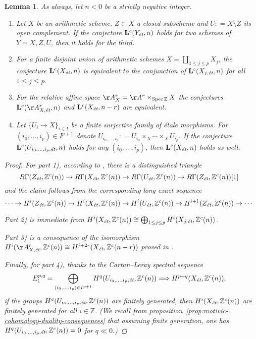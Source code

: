 \documentclass[draft,leqno,12pt]{article}
\theoremstyle{plain}
\newtheorem{lemma}[theorem]{\indent\sc Lemma}
\theoremstyle{definition}
\DeclareMathOperator{\Spec}{Spec}
\newcommand{\ZZ}{\mathbb{Z}}
\newcommand{\dfn}{\mathrel{\mathop:}=}
\newcommand{\et}{\text{\it \'{e}t}}
\begin{document}
\begin{lemma}
  \label{lemma:Lc(Xet)-operations}
  As always, let $n < 0$ be a strictly negative integer.

  \begin{enumerate}
  \item[$1)$] Let $X$ be an arithmetic scheme, $Z \subset X$ a closed subscheme
    and $U \dfn X\setminus Z$ its open complement. If the conjecture
    $\mathbf{L}^c (Y_\et,n)$ holds for two schemes of $Y = X,Z,U$, then it holds
    for the third.

  \item[$2)$] For a finite disjoint union of arithmetic schemes
    $X = \coprod_{1 \le j \le p} X_j$, the conjecture $\mathbf{L}^c (X_\et,n)$
    is equivalent to the conjunction of $\mathbf{L}^c (X_{j,\et},n)$ for all
    $1 \le j \le p$.

  \item[$3)$] For the relative affine space $\AA^r_X = \AA^r \times_{\Spec \ZZ} X$
    the conjectures $\mathbf{L}^c (\AA^r_{X,\et},n)$ and
    $\mathbf{L}^c (X_\et,n-r)$ are equivalent.

  \item[$4)$] Let $\{ U_i \to X \}_{i \in I}$ be a finite surjective family of
    \'{e}tale morphisms. For $(i_0,\ldots,i_p) \in I^{p+1}$ denote
    $U_{i_0,\ldots,i_p} \dfn U_{i_0} \times_X \cdots \times_X U_{i_p}$.
    If the conjecture $\mathbf{L}^c (U_{i_0,\ldots,i_p, \et},n)$ holds for any
    $(i_0,\ldots,i_p)$, then $\mathbf{L}^c (X_\et,n)$ holds as well.
  \end{enumerate}

  \begin{proof}
    For part 1), according to \cite[Corollary~7.2]{Geisser-2010}, there is a
    distinguished triangle
    \[ R\Gamma (Z_\et, \ZZ^c (n)) \to
       R\Gamma (X_\et, \ZZ^c (n)) \to
       R\Gamma (U_\et, \ZZ^c (n)) \to
       R\Gamma (Z_\et, \ZZ^c (n)) [1] \]
    and the claim follows from the corresponding long exact sequence
    \[ \cdots \to H^i (Z_\et, \ZZ^c (n)) \to
       H^i (X_\et, \ZZ^c (n)) \to
       H^i (U_\et, \ZZ^c (n)) \to
       H^{i+1} (Z_\et, \ZZ^c (n)) \to \cdots \]

    Part 2) is immediate from
    $H^i (X_\et, \ZZ^c (n)) \cong \bigoplus_{1 \le j \le p} H^i (X_{j,\et}, \ZZ^c (n))$.

    Part 3) is a consequence of the isomorphism
    $H^i (\AA^r_{X,\et}, \ZZ^c (n)) \cong H^{i+2r} (X_\et, \ZZ^c (n-r))$
    proved in \cite[Lemma~5.11]{Morin-2014}.

    Finally, for part 4), thanks to the Cartan--Leray spectral sequence
    \[ E_1^{p,q} = \bigoplus_{(i_0,\ldots,i_p) \in I^{p+1}} H^q (U_{i_0,\ldots,i_p, \et}, \ZZ^c (n))
      \Longrightarrow H^{p+q} (X_\et, \ZZ^c (n)), \]
    if the groups $H^q (U_{i_0,\ldots,i_p, \et}, \ZZ^c (n))$ are finitely
    generated, then $H^i (X_\et, \ZZ^c (n))$ are finitely generated for all
    $i\in \ZZ$.
    (We recall from
    proposition~\ref{prop:motivic-cohomology-duality-consequences} that assuming
    finite generation, one has $H^q (U_{i_0,\ldots,i_p, \et}, \ZZ^c (n)) = 0$
    for $q \ll 0$.)
  \end{proof}
\end{lemma}
\end{document}
